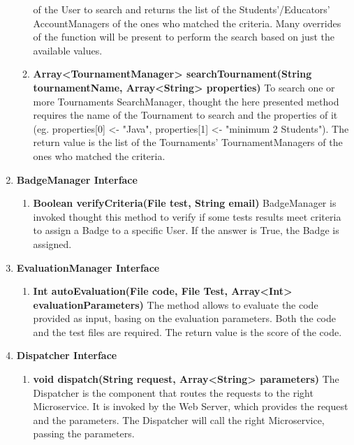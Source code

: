 \begin{enumerate}
\begin{enumerate}[label=$\bullet$]
            of the User to search and returns the list of the Students'/Educators' AccountManagers of the ones who matched the criteria. Many overrides of the function will be present to perform the search based on just the available values.
            \item \textbf{Array<TournamentManager> searchTournament(String tournamentName, Array<String> properties)} To search one or more Tournaments SearchManager, thought the here presented method requires the name of the Tournament 
            to search and the properties of it (eg. properties[0] <- "Java", properties[1] <- "minimum 2 Students"). The return value is the list of the Tournaments' TournamentManagers of the ones who matched the criteria.
        \end{enumerate}
    \item \textbf{BadgeManager Interface}
        \begin{enumerate}[label=$\bullet$]
            \item \textbf{Boolean verifyCriteria(File test, String email)} BadgeManager is invoked thought this method to verify if some tests results meet criteria to assign a Badge to a specific User. If the answer is True, the Badge
            is assigned.
        \end{enumerate}
    \item \textbf{EvaluationManager Interface}
        \begin{enumerate}[label=$\bullet$]
            \item \textbf{Int autoEvaluation(File code, File Test, Array<Int> evaluationParameters)} The method allows to evaluate the code provided as input, basing on the evaluation parameters. Both the code and the test files are
            required. The return value is the score of the code.
        \end{enumerate}
    \item \textbf{Dispatcher Interface}
        \begin{enumerate}[label=$\bullet$]
            \item \textbf{void dispatch(String request, Array<String> parameters)} The Dispatcher is the component that routes the requests to the right Microservice. It is invoked by the Web Server, which provides the request and the 
            parameters. The Dispatcher will call the right Microservice, passing the parameters.
        \end{enumerate}
\end{enumerate}

